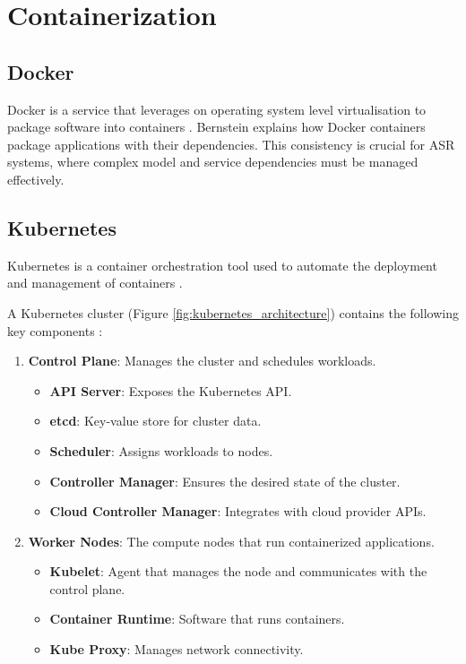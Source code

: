 \section{Containerization}
\subsection{Docker}
Docker is a service that leverages on operating system level virtualisation to package software into containers \cite{docker_definition}. Bernstein \cite{Bernstein} explains how Docker containers package applications with their dependencies. This consistency is crucial for ASR systems, where complex model and service dependencies must be managed effectively.

\subsection{Kubernetes}
Kubernetes is a container orchestration tool used to automate the deployment and management of containers \cite{k8s_definition}. 

A Kubernetes cluster (Figure \ref{fig:kubernetes_architecture}) contains the following key components \cite{k8s_cluster}:
\begin{enumerate}
    \item \textbf{Control Plane}: Manages the cluster and schedules workloads.
    \begin{itemize}
        \item \textbf{API Server}: Exposes the Kubernetes API.
        \item \textbf{etcd}: Key-value store for cluster data.
        \item \textbf{Scheduler}: Assigns workloads to nodes.
        \item \textbf{Controller Manager}: Ensures the desired state of the cluster.
        \item \textbf{Cloud Controller Manager}: Integrates with cloud provider APIs.
    \end{itemize}
    \item \textbf{Worker Nodes}: The compute nodes that run containerized applications.
    \begin{itemize}
        \item \textbf{Kubelet}: Agent that manages the node and communicates with the control plane.
        \item \textbf{Container Runtime}: Software that runs containers.
        \item \textbf{Kube Proxy}: Manages network connectivity.
    \end{itemize}
\end{enumerate}

